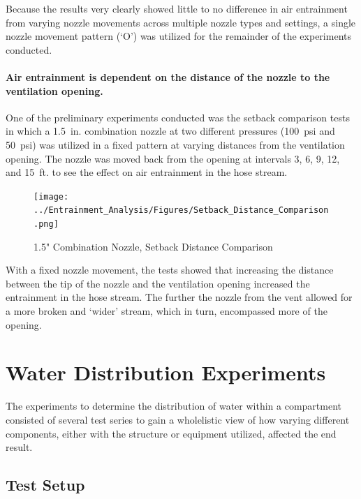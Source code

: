 \documentclass{article}
\begin{document}
Because the results very clearly showed little to no difference in air entrainment from varying nozzle movements across multiple nozzle types and settings, a single nozzle movement pattern (`O') was utilized for the remainder of the experiments conducted.

\clearpage

\paragraph{Air entrainment is dependent on the distance of the nozzle to the ventilation opening.} \mbox{}

One of the preliminary experiments conducted was the setback comparison tests in which a 1.5~in. combination nozzle at two different pressures (100~psi and 50~psi) was utilized in a fixed pattern at varying distances from the ventilation opening. The nozzle was moved back from the opening at intervals 3, 6, 9, 12, and 15~ft. to see the effect on air entrainment in the hose stream.

\begin{figure}[!ht]
	\centering
	\texttt{[image: ../Entrainment\_Analysis/Figures/Setback\_Distance\_Comparison.png]}
	\caption{1.5" Combination Nozzle, Setback Distance Comparison}
	\label{fig:1_5_Combination_Nozzle_Setback_Distance_Comparison}
\end{figure}

With a fixed nozzle movement, the tests showed that increasing the distance between the tip of the nozzle and the ventilation opening increased the entrainment in the hose stream. The further the nozzle from the vent allowed for a more broken and `wider' stream, which in turn, encompassed more of the opening.

\vspace*{\baselineskip}

\clearpage

\section{Water Distribution Experiments}

The experiments to determine the distribution of water within a compartment consisted of several test series to gain a wholelistic view of how varying different components, either with the structure or equipment utilized, affected the end result.

\subsection{Test Setup}
\end{document}
